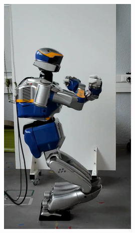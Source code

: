 \begin{figure}
\begin{subfigure}{0.19\columnwidth}
    \includegraphics[width = \columnwidth]
                    {src/chap3-optimal-motion-planning/figure/self-collision-5.png}
    \label{self-collision-5}
  \end{subfigure}
  \begin{subfigure}{0.19\columnwidth}
    \centering

\end{subfigure}
\end{figure}
